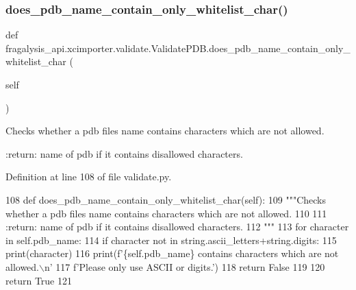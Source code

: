 \subsubsection{\texorpdfstring{does\+\_\+pdb\+\_\+name\+\_\+contain\+\_\+only\+\_\+whitelist\+\_\+char()}{does\_pdb\_name\_contain\_only\_whitelist\_char()}}
{\footnotesize\ttfamily def fragalysis\+\_\+api.\+xcimporter.\+validate.\+Validate\+P\+D\+B.\+does\+\_\+pdb\+\_\+name\+\_\+contain\+\_\+only\+\_\+whitelist\+\_\+char (\begin{DoxyParamCaption}\item[{}]{self }\end{DoxyParamCaption})}

\begin{DoxyVerb}Checks whether a pdb files name contains characters which are not allowed.

:return: name of pdb if it contains disallowed characters.
\end{DoxyVerb}
 

Definition at line 108 of file validate.\+py.


\begin{DoxyCode}
108     \textcolor{keyword}{def }does\_pdb\_name\_contain\_only\_whitelist\_char(self):
109         \textcolor{stringliteral}{"""Checks whether a pdb files name contains characters which are not allowed.}
110 \textcolor{stringliteral}{}
111 \textcolor{stringliteral}{        :return: name of pdb if it contains disallowed characters.}
112 \textcolor{stringliteral}{        """}
113         \textcolor{keywordflow}{for} character \textcolor{keywordflow}{in} self.pdb\_name:
114             \textcolor{keywordflow}{if} character \textcolor{keywordflow}{not} \textcolor{keywordflow}{in} string.ascii\_letters+string.digits:
115                 print(character)
116                 print(f\textcolor{stringliteral}{'\{self.pdb\_name\} contains characters which are not allowed.\(\backslash\)n'}
117                       f\textcolor{stringliteral}{'Please only use ASCII or digits.'})
118                 \textcolor{keywordflow}{return} \textcolor{keyword}{False}
119 
120         \textcolor{keywordflow}{return} \textcolor{keyword}{True}
121 
\end{DoxyCode}
\mbox{\label{classfragalysis__api_1_1xcimporter_1_1validate_1_1_validate_p_d_b_a9e9a8abbb1d90bb2cd17702178831f93}} 
